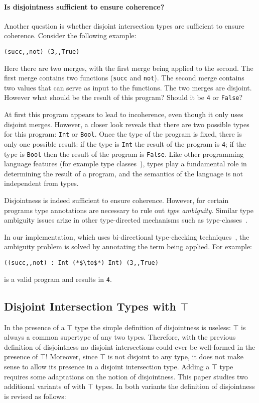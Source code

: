 \paragraph {Is disjointness sufficient to ensure coherence?} Another question
is whether disjoint intersection types are sufficient to ensure coherence. 
Consider the following example:

\begin{lstlisting}
(succ,,not) (3,,True)
\end{lstlisting}

\noindent Here there are two merges, with the first merge being applied to the second. 
The first merge contains two functions 
(\lstinline$succ$ and \lstinline$not$). The second merge contains two values 
that can serve as input to the functions. The two merges are disjoint. 
However what should be the result of this program? Should it be 
\lstinline$4$ or \lstinline$False$? 

At first this program appears to lead to incoherence, even though it only uses
disjoint merges. However, a closer look reveals that there are two possible 
types for this program: \lstinline{Int} or \lstinline{Bool}. Once the type 
of the program is fixed, there is only one possible result: if the type is 
\lstinline$Int$ the result of the program is \lstinline$4$; if the type 
is \lstinline$Bool$ then the result of the program is \lstinline$False$. 
Like other programming language features (for example type classes~\cite{}), 
types play a fundamental role in determining the result of a program, and the 
semantics of the language is not independent from types. 

Disjointness is indeed sufficient to ensure coherence. However, for
certain programs type annotations are necessary to rule out \emph{type
  ambiguity}. Similar type ambiguity issues arize in other
type-directed mechanisms such as type-classes~\cite{}.

In our implementation, which uses bi-directional type-checking techniques~\cite{}, 
the ambiguity problem is solved by annotating the term being applied. For example:

\begin{lstlisting}
((succ,,not) : Int (*$\to$*) Int) (3,,True)
\end{lstlisting}

\noindent is a valid program and results in
\lstinline$4$.

\subsection{Disjoint Intersection Types with $\top$} 
In the presence of a $\top$ type the simple definition of disjointness
is useless: $\top$ is always a common supertype of any two types.
Therefore, with the previous definition of disjointness no disjoint
intersections could ever be well-formed in the presence of $\top$!
Moreover, since $\top$ is not disjoint to any type, it does not make
sense to allow its presence in a disjoint intersection type.  Adding a
$\top$ type requires some adaptations on the notion of disjointness.
This paper studies two additional variants of \name with $\top$ types.
In both variants the definition of disjointness is revised as follows:

